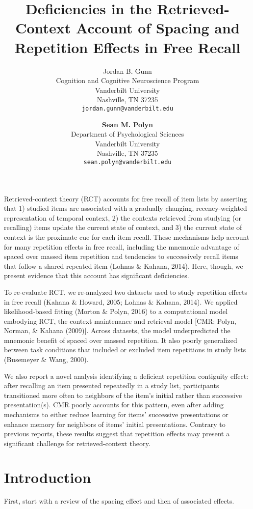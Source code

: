 \documentclass[
  letterpaper,
  DIV=11]{article}
\title{Deficiencies in the Retrieved-Context Account of Spacing and
Repetition Effects in Free Recall}
\author{Jordan B. Gunn\\
Cognition and Cognitive Neuroscience Program\\
Vanderbilt University\\
Nashville, TN 37235\\
\texttt{jordan.gunn@vanderbilt.edu} \and \textbf{Sean M. Polyn}\\
Department of Psychological Sciences\\
Vanderbilt University\\
Nashville, TN 37235\\
\texttt{sean.polyn@vanderbilt.edu}}
\date{}
\begin{document}
\maketitle

Retrieved-context theory (RCT) accounts for free recall of item lists by
asserting that 1) studied items are associated with a gradually
changing, recency-weighted representation of temporal context, 2) the
contexts retrieved from studying (or recalling) items update the current
state of context, and 3) the current state of context is the proximate
cue for each item recall. These mechanisms help account for many
repetition effects in free recall, including the mnemonic advantage of
spaced over massed item repetition and tendencies to successively recall
items that follow a shared repeated item (Lohnas \& Kahana, 2014). Here,
though, we present evidence that this account has significant
deficiencies.

To re-evaluate RCT, we re-analyzed two datasets used to study repetition
effects in free recall (Kahana \& Howard, 2005; Lohnas \& Kahana, 2014).
We applied likelihood-based fitting (Morton \& Polyn, 2016) to a
computational model embodying RCT, the context maintenance and retrieval
model {[}CMR; Polyn, Norman, \& Kahana (2009){]}. Across datasets, the
model underpredicted the mnemonic benefit of spaced over massed
repetition. It also poorly generalized between task conditions that
included or excluded item repetitions in study lists (Busemeyer \& Wang,
2000).

We also report a novel analysis identifying a deficient repetition
contiguity effect: after recalling an item presented repeatedly in a
study list, participants transitioned more often to neighbors of the
item's initial rather than successive presentation(s). CMR poorly
accounts for this pattern, even after adding mechanisms to either reduce
learning for items' successive presentations or enhance memory for
neighbors of items' initial presentations. Contrary to previous reports,
these results suggest that repetition effects may present a significant
challenge for retrieved-context theory.

\hypertarget{introduction}{%
\section{Introduction}\label{introduction}}

First, start with a review of the spacing effect and then of associated
effects.
\end{document}

